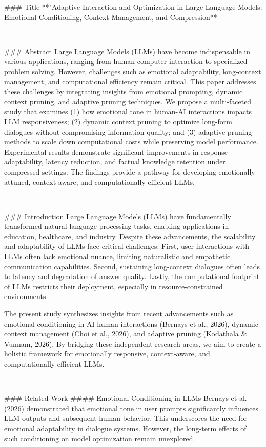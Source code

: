 ### Title  
**"Adaptive Interaction and Optimization in Large Language Models: Emotional Conditioning, Context Management, and Compression**  

---

### Abstract  
Large Language Models (LLMs) have become indispensable in various applications, ranging from human-computer interaction to specialized problem solving. However, challenges such as emotional adaptability, long-context management, and computational efficiency remain critical. This paper addresses these challenges by integrating insights from emotional prompting, dynamic context pruning, and adaptive pruning techniques. We propose a multi-faceted study that examines (1) how emotional tone in human-AI interactions impacts LLM responsiveness; (2) dynamic context pruning to optimize long-form dialogues without compromising information quality; and (3) adaptive pruning methods to scale down computational costs while preserving model performance. Experimental results demonstrate significant improvements in response adaptability, latency reduction, and factual knowledge retention under compressed settings. The findings provide a pathway for developing emotionally attuned, context-aware, and computationally efficient LLMs.

---

### Introduction  
Large Language Models (LLMs) have fundamentally transformed natural language processing tasks, enabling applications in education, healthcare, and industry. Despite these advancements, the scalability and adaptability of LLMs face critical challenges. First, user interactions with LLMs often lack emotional nuance, limiting naturalistic and empathetic communication capabilities. Second, sustaining long-context dialogues often leads to latency and degradation of answer quality. Lastly, the computational footprint of LLMs restricts their deployment, especially in resource-constrained environments.

The present study synthesizes insights from recent advancements such as emotional conditioning in AI-human interactions (Bernays et al., 2026), dynamic context management (Choi et al., 2026), and adaptive pruning (Kodathala & Vunnam, 2026). By bridging these independent research areas, we aim to create a holistic framework for emotionally responsive, context-aware, and computationally efficient LLMs.

---

### Related Work  
#### Emotional Conditioning in LLMs  
Bernays et al. (2026) demonstrated that emotional tone in user prompts significantly influences LLM outputs and subsequent human behavior. This underscores the need for emotional adaptability in dialogue systems. However, the long-term effects of such conditioning on model optimization remain unexplored.  

